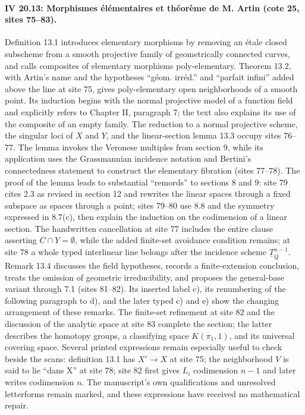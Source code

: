 \documentclass[10pt,a4paper]{article}
\begin{document}
\paragraph{IV 20.13: Morphismes élémentaires et théorème de M. Artin (cote 25, sites 75--83).}
Definition 13.1 introduces elementary morphisms by removing an étale closed subscheme from a smooth projective family of geometrically connected curves, and calls composites of elementary morphisms poly-elementary. Theorem 13.2, with Artin's name and the hypotheses ``géom. irréd.'' and ``parfait infini'' added above the line at site 75, gives poly-elementary open neighborhoods of a smooth point. Its induction begins with the normal projective model of a function field and explicitly refers to Chapter II, paragraph 7; the text also explains its use of the composite of an empty family. The reduction to a normal projective scheme, the singular loci of $X$ and $Y$, and the linear-section lemma 13.3 occupy sites 76--77. The lemma invokes the Veronese multiples from section 9, while its application uses the Grassmannian incidence notation and Bertini's connectedness statement to construct the elementary fibration (sites 77--78). The proof of the lemma leads to substantial ``remords'' to sections 8 and 9: site 79 cites 2.3 as revised in section 12 and rewrites the linear spaces through a fixed subspace as spaces through a point; sites 79--80 use 8.8 and the symmetry expressed in 8.7(c), then explain the induction on the codimension of a linear section. The handwritten cancellation at site 77 includes the entire clause asserting $C\cap Y=\emptyset$, while the added finite-set avoidance condition remains; at site 78 a whole typed interlinear line belongs after the incidence scheme $\underline{T}^{n-1}_Q$. Remark 13.4 discusses the field hypotheses, records a finite-extension conclusion, treats the omission of geometric irreducibility, and proposes the general-base variant through 7.1 (sites 81--82). Its inserted label c), its renumbering of the following paragraph to d), and the later typed c) and e) show the changing arrangement of these remarks. The finite-set refinement at site 82 and the discussion of the analytic space at site 83 complete the section; the latter describes the homotopy groups, a classifying space $K(\pi_1,1)$, and its universal covering space. Several printed expressions remain especially useful to check beside the scans: definition 13.1 has $X'\to X$ at site 75; the neighborhood $V$ is said to lie ``dans X'' at site 78; site 82 first gives $L_i$ codimension $n-1$ and later writes codimension $n$. The manuscript's own qualifications and unresolved letterforms remain marked, and these expressions have received no mathematical repair.
\par{}
\end{document}
